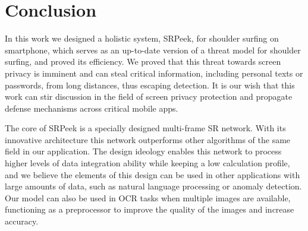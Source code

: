 \section{Conclusion}
\label{sec-conclusion}
In this work we designed a holistic system, SRPeek, for shoulder surfing on smartphone, which serves as an up-to-date version of a threat model for shoulder surfing, and proved its efficiency. We proved that this threat towards screen privacy is imminent and can steal critical information, including personal texts or passwords, from long distances, thus escaping detection. It is our wish that this work can stir discussion in the field of screen privacy protection and propagate defense mechanisms across critical mobile apps.

The core of SRPeek is a specially designed multi-frame SR network. With its innovative architecture this network outperforms other algorithms of the same field in our application. The design ideology enables this network to process higher levels of data integration ability while keeping a low calculation profile, and we believe the elements of this design can be used in other applications with large amounts of data, such as natural language processing or anomaly detection. Our model can also be used in OCR tasks when multiple images are available, functioning as a preprocessor to improve the quality of the images and increase accuracy.

